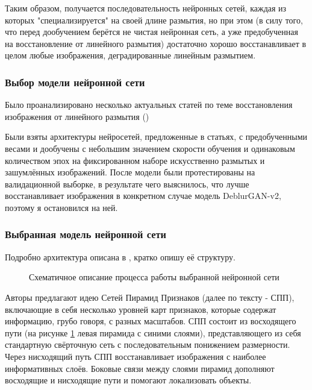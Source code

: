 Таким образом, получается последовательность нейронных сетей, каждая из которых "специализируется" на своей длине размытия, но при этом (в силу того, что перед дообучением берётся не чистая нейронная сеть, а уже предобученная на восстановление от линейного размытия) достаточно хорошо восстанавливает в целом любые изображения, деградированные линейным размытием. 

\subsubsection{Выбор модели нейронной сети}
Было проанализировано несколько актуальных статей по теме восстановления изображения от линейного размытия (\cite{dganv2, jin, srn}) 

Были взяты архитектуры нейросетей, предложенные в статьях, с предобученными весами и дообучены с небольшим значением скорости обучения и одинаковым количеством эпох на фиксированном наборе искусственно размытых и зашумлённых изображений. После модели были протестированы на валидационной выборке, в результате чего выяснилось, что лучше восстанавливает изображения в конкретном случае модель DeblurGAN-v2, поэтому я остановился на ней.

\subsubsection{ Выбранная модель нейронной сети}

Подробно архитектура описана в \cite{dganv2}, кратко опишу её структуру.

\begin{figure}[H]
\begin{minipage}[h]{1\linewidth}
\end{minipage}
\caption{ Схематичное описание процесса работы выбранной нейронной сети }
\label{ris:dgan_arch}
\end{figure}

Авторы предлагают идею Сетей Пирамид Признаков (далее по тексту - СПП), включающие в себя несколько уровней карт признаков, которые содержат информацию, грубо говоря, с разных масштабов. СПП состоит из восходящего пути (на рисунке \ref{ris:dgan_arch} левая пирамида с синими слоями), представляющего из себя стандартную свёрточную сеть с последовательным понижением размерности. Через нисходящий путь СПП восстанавливает изображения с наиболее информативных слоёв. Боковые связи между слоями пирамид дополняют восходящие и нисходящие пути и помогают локализовать объекты.

